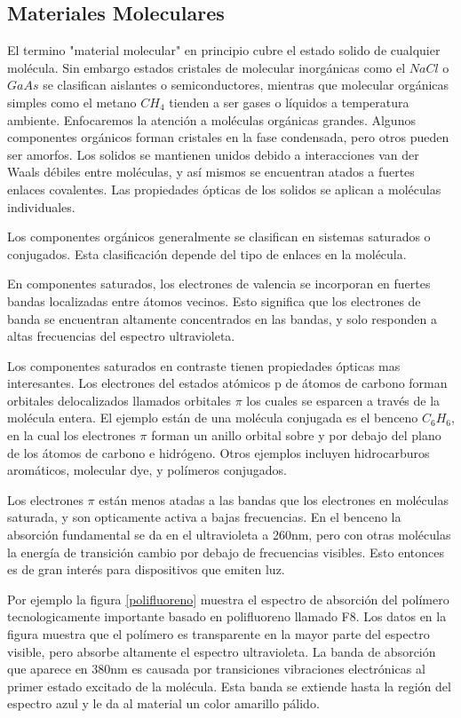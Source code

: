 \documentclass[a4paper,openright,12pt]{book}
\begin{document}
\subsection{Materiales Moleculares}
El termino "material molecular" en principio cubre el estado solido de cualquier molécula. Sin embargo estados cristales de molecular inorgánicas como el $NaCl$ o $GaAs$ se clasifican aislantes o semiconductores, mientras que molecular orgánicas simples como el metano $CH_{4}$ tienden a ser gases o líquidos a temperatura ambiente. Enfocaremos la atención a moléculas orgánicas grandes.
Algunos componentes orgánicos forman cristales en la fase condensada, pero otros pueden ser amorfos. Los solidos se mantienen unidos debido a interacciones van der Waals débiles entre moléculas, y así mismos se encuentran atados a fuertes enlaces covalentes. Las propiedades ópticas de los solidos se aplican a moléculas individuales.

Los componentes orgánicos generalmente se clasifican en sistemas saturados o conjugados. Esta clasificación depende del tipo de enlaces en la molécula.

En componentes saturados, los electrones de valencia se incorporan en fuertes bandas localizadas entre átomos vecinos. Esto significa que los electrones de banda se encuentran altamente concentrados en las bandas, y solo responden a altas frecuencias del espectro ultravioleta. 

Los componentes saturados en contraste tienen propiedades ópticas mas interesantes. Los electrones del estados atómicos p de átomos de carbono forman orbitales delocalizados llamados orbitales $\pi$ los cuales se esparcen a través de la molécula entera. El ejemplo están de una molécula conjugada es el benceno $C_{6}H_{6}$, en la cual los electrones $\pi$ forman un anillo orbital sobre y por debajo del plano de los átomos de carbono e hidrógeno. Otros ejemplos incluyen hidrocarburos aromáticos, molecular dye, y polímeros conjugados.

Los electrones $\pi$ están menos atadas a las bandas que los electrones en moléculas saturada, y son opticamente activa a bajas frecuencias. En el benceno la absorción fundamental se da en el ultravioleta a 260nm, pero con otras moléculas la energía de transición cambio por debajo de frecuencias visibles. Esto entonces es de gran interés para dispositivos que emiten luz.

Por ejemplo la figura \ref{polifluoreno} muestra el espectro de absorción del polímero tecnologicamente importante basado en polifluoreno llamado F8. Los datos en la figura muestra que el polímero es transparente en la mayor parte del espectro visible, pero absorbe altamente el espectro ultravioleta. La banda de absorción que aparece en 380nm es causada por transiciones vibraciones electrónicas al primer estado excitado de la molécula. Esta banda se extiende hasta la región del espectro azul y le da al material un color amarillo pálido.
\end{document}
